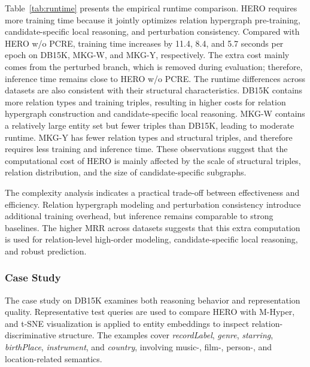 \documentclass[pdflatex,sn-mathphys-num]{sn-jnl}
\begin{document}
Table~\ref{tab:runtime} presents the empirical runtime comparison. HERO requires more training time because it jointly optimizes relation hypergraph pre-training, candidate-specific local reasoning, and perturbation consistency. Compared with HERO w/o PCRE, training time increases by 11.4, 8.4, and 5.7 seconds per epoch on DB15K, MKG-W, and MKG-Y, respectively. The extra cost mainly comes from the perturbed branch, which is removed during evaluation; therefore, inference time remains close to HERO w/o PCRE.
The runtime differences across datasets are also consistent with their structural characteristics. DB15K contains more relation types and training triples, resulting in higher costs for relation hypergraph construction and candidate-specific local reasoning. MKG-W contains a relatively large entity set but fewer triples than DB15K, leading to moderate runtime. MKG-Y has fewer relation types and structural triples, and therefore requires less training and inference time. These observations suggest that the computational cost of HERO is mainly affected by the scale of structural triples, relation distribution, and the size of candidate-specific subgraphs.

The complexity analysis indicates a practical trade-off between effectiveness and efficiency. Relation hypergraph modeling and perturbation consistency introduce additional training overhead, but inference remains comparable to strong baselines. The higher MRR across datasets suggests that this extra computation is used for relation-level high-order modeling, candidate-specific local reasoning, and robust prediction.


\subsubsection{Case Study}

The case study on DB15K examines both reasoning behavior and representation quality. Representative test queries are used to compare HERO with M-Hyper, and t-SNE visualization is applied to entity embeddings to inspect relation-discriminative structure. The examples cover \textit{recordLabel}, \textit{genre}, \textit{starring}, \textit{birthPlace}, \textit{instrument}, and \textit{country}, involving music-, film-, person-, and location-related semantics.
\end{document}
